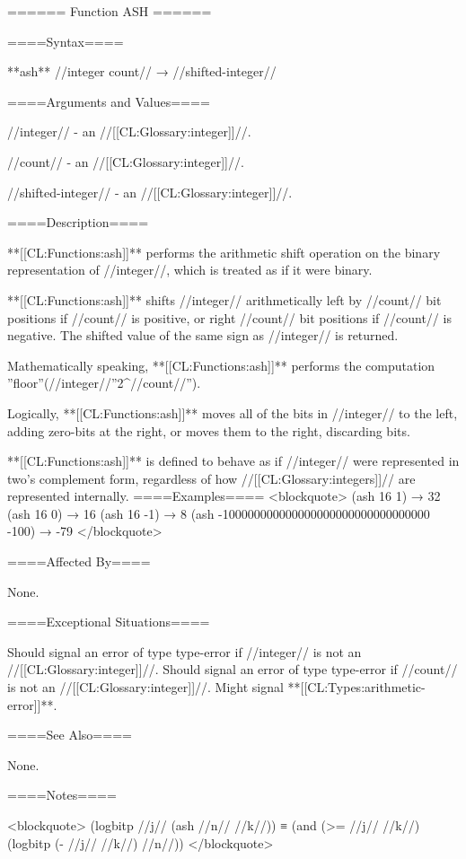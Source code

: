====== Function ASH ======

====Syntax====

**ash** //integer count// → //shifted-integer//

====Arguments and Values====

//integer// - an //[[CL:Glossary:integer]]//.

//count// - an //[[CL:Glossary:integer]]//.

//shifted-integer// - an //[[CL:Glossary:integer]]//.

====Description====

**[[CL:Functions:ash]]** performs the arithmetic shift operation on the binary representation of //integer//, which is treated as if it were binary.

**[[CL:Functions:ash]]** shifts //integer// arithmetically left by //count// bit positions if //count// is positive, or right //count// bit positions if //count// is negative. The shifted value of the same sign as //integer// is returned.

Mathematically speaking, **[[CL:Functions:ash]]** performs the computation ''floor''(//integer//\centerdot ''2^//count//'').

Logically, **[[CL:Functions:ash]]** moves all of the bits in //integer// to the left, adding zero-bits at the right, or moves them to the right, discarding bits.

**[[CL:Functions:ash]]** is defined to behave as if //integer// were represented in two's complement form, regardless of how //[[CL:Glossary:integers]]// are represented internally. ====Examples==== <blockquote> (ash 16 1) → 32 (ash 16 0) → 16 (ash 16 -1) → 8 (ash -100000000000000000000000000000000 -100) → -79 </blockquote>

====Affected By====

None.

====Exceptional Situations====

Should signal an error of type type-error if //integer// is not an //[[CL:Glossary:integer]]//. Should signal an error of type type-error if //count// is not an //[[CL:Glossary:integer]]//. Might signal **[[CL:Types:arithmetic-error]]**.

====See Also====

None.

====Notes====

<blockquote> (logbitp //j// (ash //n// //k//)) ≡ (and (>= //j// //k//) (logbitp (- //j// //k//) //n//)) </blockquote>

